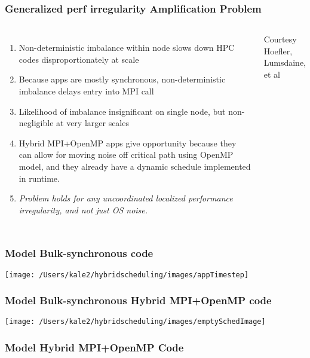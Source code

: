\begin{frame}
\frametitle{Generalized perf irregularity Amplification Problem}
\begin{columns}
\begin{enumerate}
\item \tiny Non-deterministic imbalance within node slows down HPC codes disproportionately at scale
\item \tiny Because apps are mostly synchronous, non-deterministic imbalance delays entry into MPI call
\item \tiny Likelihood of imbalance insignificant on single node, but non-negligible at very larger scales
\item \tiny Hybrid MPI+OpenMP apps give opportunity because they can allow for moving noise off critical path using OpenMP model, and they already have a dynamic schedule implemented in runtime.
\item \tiny \textit{Problem holds for any uncoordinated localized performance irregularity, and not just OS noise.}
\end{enumerate}
\begin{center}
\small Courtesy Hoefler, Lumsdaine, et al
\end{center}
\end{columns}
\end{frame}

\begin{frame}
\frametitle{Model Bulk-synchronous code }

\begin{center}
\texttt{[image: /Users/kale2/hybridscheduling/images/appTimestep]}
\end{center}
\end{frame}

\begin{frame}
\frametitle{Model Bulk-synchronous Hybrid MPI+OpenMP code }

\begin{center}
\texttt{[image: /Users/kale2/hybridscheduling/images/emptySchedImage]}
\end{center}
\end{frame}

\begin{frame}
\frametitle{Model Hybrid MPI+OpenMP Code}
\end{frame}

